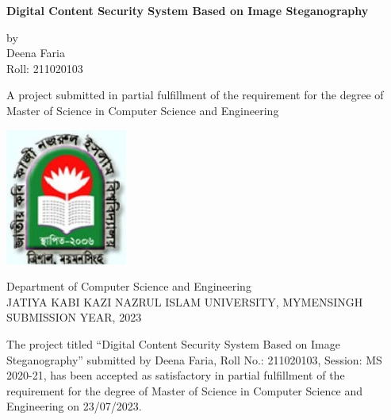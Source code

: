 \documentclass{report}
\begin{document}
\begin{titlepage}
    \centering
    \vspace*{1cm} %
    
    \Large{\textbf{Digital Content Security System Based on Image Steganography }}
    \vspace{1.5cm} %
    
     by\\

     Deena Faria\\
    Roll: 211020103

    \vspace{3cm} %
    
    A project submitted in partial fulfillment of the requirement for the degree of
    Master of Science in Computer Science and Engineering \par
    \vspace{1.5cm} %
    
    \includegraphics[width=0.3\textwidth]{image1.jpeg}
    \par
    \vfill %
    Department of Computer Science and Engineering\\
    JATIYA KABI KAZI NAZRUL ISLAM UNIVERSITY, MYMENSINGH\\
    SUBMISSION YEAR, 2023
\end{titlepage}

\newpage
{}
\vspace{2cm}

The project titled “Digital Content Security System Based on Image Steganography” submitted by Deena Faria, Roll No.: 211020103, Session: MS 2020-21, has been accepted as satisfactory in partial fulfillment of the requirement for the degree of Master of Science in Computer Science and Engineering on 23/07/2023.
\end{document}
